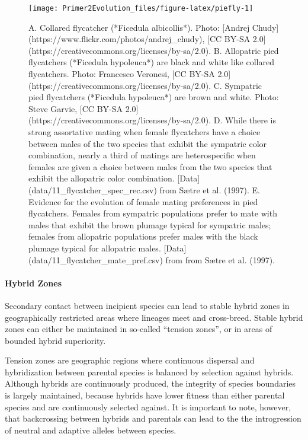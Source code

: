 \documentclass[
]{book}
\begin{document}
\begin{figure}
\texttt{[image: Primer2Evolution\_files/figure-latex/piefly-1]} \caption{A. Collared flycatcher (*Ficedula albicollis*). Photo: [Andrej Chudy](https://www.flickr.com/photos/andrej_chudy), [CC BY-SA 2.0](https://creativecommons.org/licenses/by-sa/2.0). B. Allopatric pied flycatchers (*Ficedula hypoleuca*) are black and white like collared flycatchers. Photo: Francesco Veronesi, [CC BY-SA 2.0](https://creativecommons.org/licenses/by-sa/2.0). C. Sympatric pied flycatchers (*Ficedula hypoleuca*) are brown and white. Photo: Steve Garvie, [CC BY-SA 2.0](https://creativecommons.org/licenses/by-sa/2.0). D. While there is strong assortative mating when female flycatchers have a choice between males of the two species that exhibit the sympatric color combination, nearly a third of matings are heterospecific when females are given a choice between males from the two species that exhibit the allopatric color combination. [Data](data/11_flycatcher_spec_rec.csv) from Sætre et al. (1997). E. Evidence for the evolution of female mating preferences in pied flycatchers. Females from sympatric populations prefer to mate with males that exhibit the brown plumage typical for sympatric males; females from allopatric populations prefer males with the black plumage typical for allopatric males. [Data](data/11_flycatcher_mate_pref.csv) from from Sætre et al. (1997).}\label{fig:piefly}
\end{figure}

\hypertarget{hybrid-zones}{%
\paragraph*{Hybrid Zones}\label{hybrid-zones}}

Secondary contact between incipient species can lead to stable hybrid zones in geographically restricted areas where lineages meet and cross-breed. Stable hybrid zones can either be maintained in so-called ``tension zones'', or in areas of bounded hybrid superiority.

Tension zones are geographic regions where continuous dispersal and hybridization between parental species is balanced by selection against hybrids. Although hybrids are continuously produced, the integrity of species boundaries is largely maintained, because hybrids have lower fitness than either parental species and are continuously selected against. It is important to note, however, that backcrossing between hybrids and parentals can lead to the the introgression of neutral and adaptive alleles between species.
\end{document}
